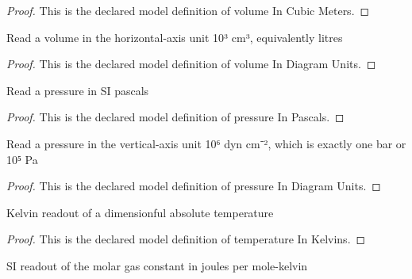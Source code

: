 \begin{proof}
  This is the declared model definition of volume In Cubic Meters.
\end{proof}
\begin{definition}
  \label{def:physics:phyx-mini-0358:phyxminiproblems-problemphyxmini0358-volumeindiagramunits}
  Read a volume in the horizontal-axis unit 10³ cm³, equivalently litres
\end{definition}
\begin{proof}
  This is the declared model definition of volume In Diagram Units.
\end{proof}
\begin{definition}
  \label{def:physics:phyx-mini-0358:phyxminiproblems-problemphyxmini0358-pressureinpascals}
  Read a pressure in SI pascals
\end{definition}
\begin{proof}
  This is the declared model definition of pressure In Pascals.
\end{proof}
\begin{definition}
  \label{def:physics:phyx-mini-0358:phyxminiproblems-problemphyxmini0358-pressureindiagramunits}
  Read a pressure in the vertical-axis unit 10⁶ dyn cm⁻², which is exactly one bar or 10⁵ Pa
\end{definition}
\begin{proof}
  This is the declared model definition of pressure In Diagram Units.
\end{proof}
\begin{definition}
  \label{def:physics:phyx-mini-0358:phyxminiproblems-problemphyxmini0358-temperatureinkelvins}
  Kelvin readout of a dimensionful absolute temperature
\end{definition}
\begin{proof}
  This is the declared model definition of temperature In Kelvins.
\end{proof}
\begin{definition}
  \label{def:physics:phyx-mini-0358:phyxminiproblems-problemphyxmini0358-molargasconstantinjoulespermolekelvin}
  SI readout of the molar gas constant in joules per mole-kelvin
\end{definition}
